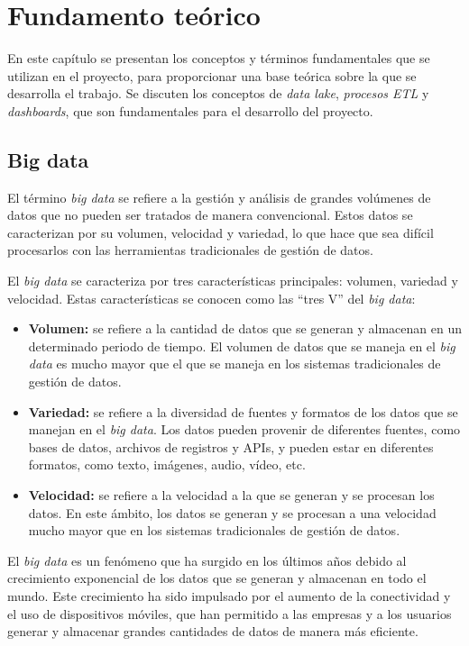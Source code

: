 \chapter{Fundamento teórico}\label{chap:teo}
En este capítulo se presentan los conceptos y términos fundamentales que se utilizan en el
proyecto, para proporcionar una base teórica sobre la que se desarrolla el trabajo. Se discuten
los conceptos de \textit{data lake}, \textit{procesos ETL} y \textit{dashboards}, que son
fundamentales para el desarrollo del proyecto.

\section{Big data}\label{sec:bigdata}
El término \textit{big data} se refiere a la gestión y análisis de grandes volúmenes de datos
que no pueden ser tratados de manera convencional. Estos datos se caracterizan por su volumen,
velocidad y variedad, lo que hace que sea difícil procesarlos con las herramientas tradicionales
de gestión de datos.

El \textit{big data} se caracteriza por tres características principales: volumen, variedad y
velocidad. Estas características se conocen como las ``tres V'' del \textit{big data}:

\begin{itemize}
	\item \textbf{Volumen:} se refiere a la cantidad de datos que se generan y almacenan en un
		determinado periodo de tiempo. El volumen de datos que se maneja en el \textit{big data}
		es mucho mayor que el que se maneja en los sistemas tradicionales de gestión de datos.
	\item \textbf{Variedad:} se refiere a la diversidad de fuentes y formatos de los datos que
		se manejan en el \textit{big data}. Los datos pueden provenir de diferentes fuentes, como
		bases de datos, archivos de registros y APIs, y pueden estar en diferentes formatos, como
		texto, imágenes, audio, vídeo, etc.
	\item \textbf{Velocidad:} se refiere a la velocidad a la que se generan y se procesan los
		datos. En este ámbito, los datos se generan y se procesan a una velocidad mucho
		mayor que en los sistemas tradicionales de gestión de datos.
\end{itemize}

El \textit{big data} es un fenómeno que ha surgido en los últimos años debido al crecimiento
exponencial de los datos que se generan y almacenan en todo el mundo. Este crecimiento ha
sido impulsado por el aumento de la conectividad y el uso de dispositivos móviles, que han
permitido a las empresas y a los usuarios generar y almacenar grandes cantidades de datos
de manera más eficiente.


